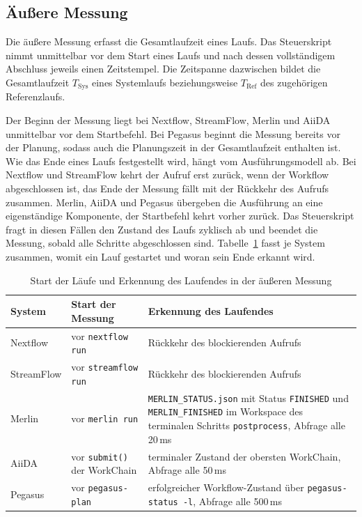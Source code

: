 \subsection{Äußere Messung}
\label{sec:methodik:aussen}

Die äußere Messung erfasst die Gesamtlaufzeit eines Laufs. Das
Steuerskript nimmt unmittelbar vor dem Start eines Laufs und nach
dessen vollständigem Abschluss jeweils einen Zeitstempel. Die
Zeitspanne dazwischen bildet die Gesamtlaufzeit
$T_\mathrm{Sys}$ eines Systemlaufs beziehungsweise
$T_\mathrm{Ref}$ des zugehörigen Referenzlaufs.

Der Beginn der Messung liegt bei Nextflow, StreamFlow, Merlin und
AiiDA unmittelbar vor dem Startbefehl. Bei Pegasus beginnt die
Messung bereits vor der Planung, sodass auch die Planungszeit in
der Gesamtlaufzeit enthalten ist. Wie das Ende eines Laufs festgestellt wird, hängt vom
Ausführungsmodell ab. Bei Nextflow und StreamFlow kehrt der Aufruf
erst zurück, wenn der Workflow abgeschlossen ist, das Ende der
Messung fällt mit der Rückkehr des Aufrufs zusammen. Merlin, AiiDA
und Pegasus übergeben die Ausführung an eine eigenständige
Komponente, der Startbefehl kehrt vorher zurück. Das Steuerskript
fragt in diesen Fällen den Zustand des Laufs zyklisch ab und
beendet die Messung, sobald alle Schritte abgeschlossen sind.
Tabelle~\ref{tab:methodik:endeerkennung} fasst je System zusammen,
womit ein Lauf gestartet und woran sein Ende erkannt wird.

\begin{table}[H]
  \caption{Start der Läufe und Erkennung des Laufendes in der äußeren Messung}
  \label{tab:methodik:endeerkennung}
  \centering
  \footnotesize
  \renewcommand{\arraystretch}{1.3}
  \begin{tabular}{>{\raggedright\arraybackslash}p{1.8cm}
                  >{\raggedright\arraybackslash}p{3.4cm}
                  >{\raggedright\arraybackslash}p{7.0cm}}
    \hline
    \textbf{System} & \textbf{Start der Messung} & \textbf{Erkennung des Laufendes} \\
    \hline
    Nextflow & vor \texttt{nextflow run} & Rückkehr des blockierenden Aufrufs \\
    StreamFlow & vor \texttt{streamflow run} & Rückkehr des blockierenden Aufrufs \\
    Merlin & vor \texttt{merlin run} & \texttt{MERLIN\_STATUS.json} mit Status \texttt{FINISHED} und \texttt{MERLIN\_FINISHED} im Workspace des terminalen Schritts \texttt{postprocess}, Abfrage alle 20\,ms \\
    AiiDA & vor \texttt{submit()} der WorkChain & terminaler Zustand der obersten WorkChain, Abfrage alle 50\,ms \\
    Pegasus & vor \texttt{pegasus-plan} & erfolgreicher Workflow-Zustand über \texttt{pegasus-status -l}, Abfrage alle 500\,ms \\
    \hline
  \end{tabular}
\end{table}

